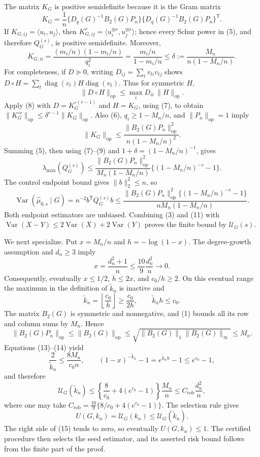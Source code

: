 The matrix \(K_G\) is positive semidefinite because it is the Gram matrix
\[
K_G=\frac1n
\{D_q(G)^{-1}B_2(G)P_n\}
\{D_q(G)^{-1}B_2(G)P_n\}^{\mathsf T}.
\tag{6}
\]
If \(K_{G,ij}=\langle u_i,u_j\rangle\), then
\(K_{G,ij}^r=\langle u_i^{\otimes r},u_j^{\otimes r}\rangle\); hence every Schur power in (5), and therefore \(Q_G^{(s)}\), is positive semidefinite.  Moreover,
\[
K_{G,ii}=\frac{(m_i/n)(1-m_i/n)}{q_i^2}
=\frac{m_i/n}{1-m_i/n}
\le\delta:=\frac{M_n}{n(1-M_n/n)}.
\tag{7}
\]
For completeness, if \(D\succeq0\), writing \(D_{ij}=\sum_t v_{ti}v_{tj}\) shows
\(D\circ H=\sum_t\operatorname{diag}(v_t)H\operatorname{diag}(v_t)\).  Thus for symmetric \(H\),
\[
\|D\circ H\|_{\mathrm{op}}
\le\max_iD_{ii}\,\|H\|_{\mathrm{op}}.
\tag{8}
\]
Apply (8) with \(D=K_G^{\circ(r-1)}\) and \(H=K_G\), using (7), to obtain
\(\|K_G^{\circ r}\|_{\mathrm{op}}\le\delta^{r-1}\|K_G\|_{\mathrm{op}}\).  Also (6), \(q_i\ge1-M_n/n\), and \(\|P_n\|_{\mathrm{op}}=1\) imply
\[
\|K_G\|_{\mathrm{op}}
\le\frac{\|B_2(G)P_n\|_{\mathrm{op}}^2}
{n(1-M_n/n)^2}.
\tag{9}
\]
Summing (5), then using (7)--(9) and \(1+\delta=(1-M_n/n)^{-1}\), gives
\[
\lambda_{\max}(Q_G^{(s)})
\le
\frac{\|B_2(G)P_n\|_{\mathrm{op}}^2}
{M_n(1-M_n/n)}
\{(1-M_n/n)^{-s}-1\}.
\tag{10}
\]
The control endpoint bound gives \(\|b\|_2^2\le n\), so
\[
\operatorname{Var}(\widehat\mu_{0,s}\mid G)
=n^{-2}b^{\mathsf T}Q_G^{(s)}b
\le
\frac{\|B_2(G)P_n\|_{\mathrm{op}}^2
\{(1-M_n/n)^{-s}-1\}}
{nM_n(1-M_n/n)}.
\tag{11}
\]
Both endpoint estimators are unbiased.  Combining (3) and (11) with
\(\operatorname{Var}(X-Y)\le2\operatorname{Var}(X)+2\operatorname{Var}(Y)\) proves the finite bound by \(\mathcal U_G(s)\).

We next specialize.  Put \(x=M_n/n\) and \(h=-\log(1-x)\).  The degree-growth assumption and \(d_n\ge3\) imply
\[
x=\frac{d_n^2+1}{n}\le\frac{10}{9}\frac{d_n^2}{n}\longrightarrow0.
\tag{12}
\]
Consequently, eventually \(x\le1/2\), \(h\le2x\), and \(c_0/h\ge2\).  On this eventual range the maximum in the definition of \(\widetilde k_n\) is inactive and
\[
\widetilde k_n=\left\lfloor\frac{c_0}{h}\right\rfloor
\ge\frac{c_0}{2h},
\qquad
\widetilde k_nh\le c_0.
\tag{13}
\]
The matrix \(B_2(G)\) is symmetric and nonnegative, and (1) bounds all its row and column sums by \(M_n\).  Hence
\[
\|B_2(G)P_n\|_{\mathrm{op}}
\le\|B_2(G)\|_{\mathrm{op}}
\le\sqrt{\|B_2(G)\|_1\|B_2(G)\|_\infty}
\le M_n.
\tag{14}
\]
Equations (13)--(14) yield
\[
\frac{2}{\widetilde k_n}\le\frac{8M_n}{c_0n},
\qquad
(1-x)^{-\widetilde k_n}-1=e^{\widetilde k_nh}-1\le e^{c_0}-1,
\]
and therefore
\[
\mathcal U_G(\widetilde k_n)
\le\left\{\frac8{c_0}+4(e^{c_0}-1)\right\}\frac{M_n}{n}
\le C_{\mathrm{rob}}\frac{d_n^2}{n},
\tag{15}
\]
where one may take
\(C_{\mathrm{rob}}=\frac{10}{9}\{8/c_0+4(e^{c_0}-1)\}\).  The selection rule gives
\[
U(G,k_n)=\mathcal U_G(k_n)\le\mathcal U_G(\widetilde k_n).
\]
The right side of (15) tends to zero, so eventually \(U(G,k_n)\le1\).  The certified procedure then selects the seed estimator, and its asserted risk bound follows from the finite part of the proof.

